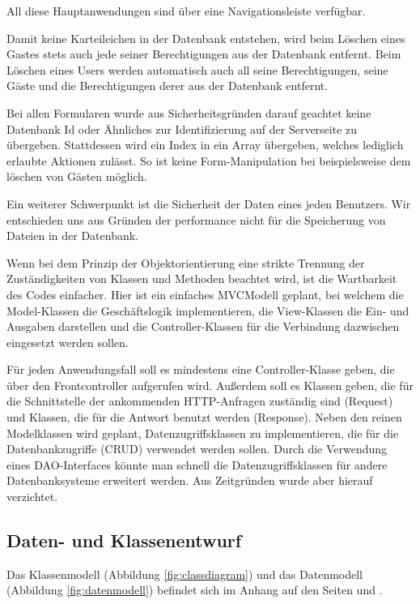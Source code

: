 \documentclass[10.5pt]{scrarticle}
\begin{document}
All diese Hauptanwendungen sind über eine Navigationsleiste verfügbar.

Damit keine Karteileichen in der Datenbank entstehen, wird beim Löschen eines Gastes stets auch jede seiner Berechtigungen aus der Datenbank entfernt. Beim Löschen eines Users werden automatisch auch all seine Berechtigungen, seine Gäste und die Berechtigungen derer aus der Datenbank entfernt.

Bei allen Formularen wurde aus Sicherheitsgründen darauf geachtet keine Datenbank Id oder Ähnliches zur Identifizierung auf der Serverseite zu übergeben. Stattdessen wird ein Index in ein Array übergeben, welches lediglich erlaubte Aktionen zulässt. So ist keine Form-Manipulation bei beispielsweise dem löschen von Gästen möglich.

Ein weiterer Schwerpunkt ist die Sicherheit der Daten eines jeden Benutzers. Wir entschieden uns aus Gründen der performance nicht für die Speicherung von Dateien in der Datenbank.

Wenn bei dem Prinzip der Objektorientierung eine strikte Trennung der Zuständigkeiten von Klassen und Methoden beachtet wird, ist die Wartbarkeit des Codes einfacher. Hier ist ein einfaches MVCModell geplant, bei welchem die Model-Klassen die Geschäftslogik implementieren, die View-Klassen die Ein- und Ausgaben darstellen und die Controller-Klassen für die Verbindung dazwischen eingesetzt werden sollen. 

 Für jeden Anwendungsfall soll es mindestens eine Controller-Klasse geben, die über den Frontcontroller aufgerufen wird. Au{\ss}erdem soll es Klassen geben, die für die Schnittstelle der ankommenden HTTP-Anfragen zuständig sind (Request) und Klassen, die für die Antwort benutzt werden (Response). Neben den reinen Modelklassen wird geplant, Datenzugriffsklassen zu implementieren, die für die Datenbankzugriffe (CRUD) verwendet werden sollen. Durch die Verwendung eines DAO-Interfaces könnte man schnell die Datenzugriffsklassen für andere Datenbanksysteme erweitert werden. Aus Zeitgründen wurde aber hierauf verzichtet. 

\subsection{Daten- und Klassenentwurf}

Das Klassenmodell (Abbildung \ref{fig:classdiagram}) und das Datenmodell (Abbildung \ref{fig:datenmodell}) befindet sich im Anhang auf den Seiten \pageref{fig:classdiagram} und \pageref{fig:datenmodell}.
\end{document}
